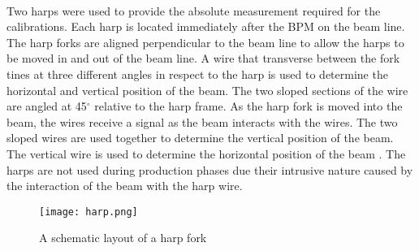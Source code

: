		\paragraph{} Two harps were used to provide the absolute measurement required for the calibrations. Each harp is located immediately after the BPM on the beam line. The harp forks are aligned perpendicular to the beam line to allow the harps to be moved in and out of the beam line. A wire that transverse between the fork tines at three different angles in respect to the harp is used to determine the horizontal and vertical position of the beam. The two sloped sections of the wire are angled at 45$^{\circ}$ relative to the harp frame. As the harp fork is moved into the beam, the wires receive a signal as the beam interacts with the wires. The two sloped wires are used together to determine the vertical position of the beam. The vertical wire is used to determine the horizontal position of the beam \cite{BPM,BPM2}. The harps are not used during production phases due their intrusive nature caused by the interaction of the beam with the harp wire.
		\begin{figure}[H]
			\centering
			\caption{A schematic layout of a harp fork \cite{BPM2} }
			\label{harp}
			\texttt{[image: harp.png]} 
		\end{figure}  	
		
